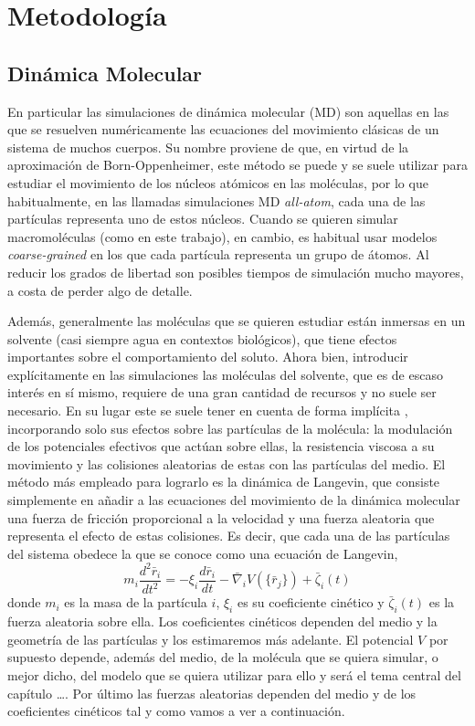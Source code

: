 \chapter{Metodología}
\label{cap:methodology}

\section{Dinámica Molecular}

En particular las simulaciones de dinámica molecular (MD) \cite{Rapaport2004} son aquellas en las que se resuelven numéricamente las ecuaciones del movimiento clásicas de un sistema de muchos cuerpos. Su nombre proviene de que, en virtud de la aproximación de Born-Oppenheimer, este método se puede y se suele utilizar para estudiar el movimiento de los núcleos atómicos en las moléculas, por lo que habitualmente, en las llamadas simulaciones MD \textit{all-atom}, cada una de las partículas representa uno de estos núcleos. Cuando se quieren simular macromoléculas (como en este trabajo), en cambio, es habitual usar modelos \textit{coarse-grained} en los que cada partícula representa un grupo de átomos. Al reducir los grados de libertad son posibles tiempos de simulación mucho mayores, a costa de perder algo de detalle.

Además, generalmente las moléculas que se quieren estudiar están inmersas en un solvente (casi siempre agua en contextos biológicos), que tiene efectos importantes sobre el comportamiento del soluto. Ahora bien, introducir explícitamente en las simulaciones las moléculas del solvente, que es de escaso interés en sí mismo, requiere de una gran cantidad de recursos y no suele ser necesario. En su lugar este se suele tener en cuenta de forma implícita \cite{Leach2001}, incorporando solo sus efectos sobre las partículas de la molécula: la modulación de los potenciales efectivos que actúan sobre ellas, la resistencia viscosa a su movimiento y las colisiones aleatorias de estas con las partículas del medio. El método más empleado para lograrlo es la dinámica de Langevin, que consiste simplemente en añadir a las ecuaciones del movimiento de la dinámica molecular una fuerza de fricción proporcional a la velocidad y una fuerza aleatoria que representa el efecto de estas colisiones. Es decir, que cada una de las partículas del sistema obedece la que se conoce como una ecuación de Langevin,
\begin{equation}
    \label{eq:Langevin}
    m_i\frac{d^2\bar{r}_i}{dt^2}=-\xi_i\frac{d\bar{r}_i}{dt}-\bar{\nabla}_iV\left(\{\bar{r}_j\}\right)+\bar{\zeta}_i(t)
\end{equation}
donde $m_i$ es la masa de la partícula $i$, $\xi_i$ es su coeficiente cinético y $\bar{\zeta}_i(t)$ es la fuerza aleatoria sobre ella. Los coeficientes cinéticos dependen del medio y la geometría de las partículas y los estimaremos más adelante. El potencial $V$ por supuesto depende, además del medio, de la molécula que se quiera simular, o mejor dicho, del modelo que se quiera utilizar para ello y será el tema central del capítulo \dots. Por último las fuerzas aleatorias dependen del medio y de los coeficientes cinéticos tal y como vamos a ver a continuación.

